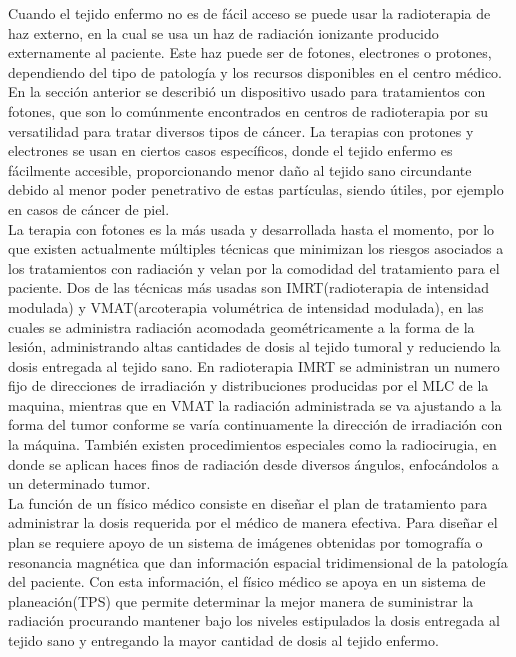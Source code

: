 Cuando el tejido enfermo no es de fácil acceso se puede usar la radioterapia de haz externo, en la cual se usa un haz de radiación ionizante producido externamente al paciente. Este haz puede ser de fotones, electrones o protones, dependiendo del tipo de patología y los recursos disponibles en el centro médico. En la sección anterior se describió un dispositivo usado para tratamientos con fotones, que son lo comúnmente encontrados en centros de radioterapia por su versatilidad para tratar diversos tipos de cáncer. La terapias con protones y electrones se usan en ciertos casos específicos, donde el tejido enfermo es fácilmente accesible, proporcionando menor daño al tejido sano circundante debido al menor poder penetrativo de estas partículas, siendo útiles, por ejemplo en casos de cáncer de piel.\\

La terapia con fotones es la más usada y desarrollada hasta el momento, por lo que existen actualmente múltiples técnicas que minimizan los riesgos asociados a los tratamientos con radiación y velan por la comodidad del tratamiento para el paciente. Dos de las técnicas más usadas son IMRT(radioterapia de intensidad modulada) y VMAT(arcoterapia volumétrica de intensidad modulada), en las cuales se administra radiación acomodada geométricamente a la forma de la lesión, administrando altas cantidades de dosis al tejido tumoral y reduciendo la dosis entregada al tejido sano. En radioterapia IMRT se administran un numero fijo de direcciones de irradiación y distribuciones producidas por el MLC de la maquina, mientras que en VMAT la radiación administrada se va ajustando a la forma del tumor conforme se varía continuamente la dirección de irradiación con la máquina. También existen procedimientos especiales como la radiocirugia, en donde se aplican haces finos de radiación desde diversos ángulos, enfocándolos a un determinado tumor.\\



La función de un físico médico consiste en diseñar el plan de tratamiento para administrar la dosis requerida por el médico de manera efectiva. Para diseñar el plan se requiere apoyo de un sistema de imágenes obtenidas por tomografía o resonancia magnética que dan información espacial tridimensional de la patología del paciente. Con esta información, el físico médico se apoya en un sistema de planeación(TPS) que permite determinar la mejor manera de suministrar la radiación procurando mantener bajo los niveles estipulados la dosis entregada al tejido sano y entregando la mayor cantidad de dosis al tejido enfermo.\\

